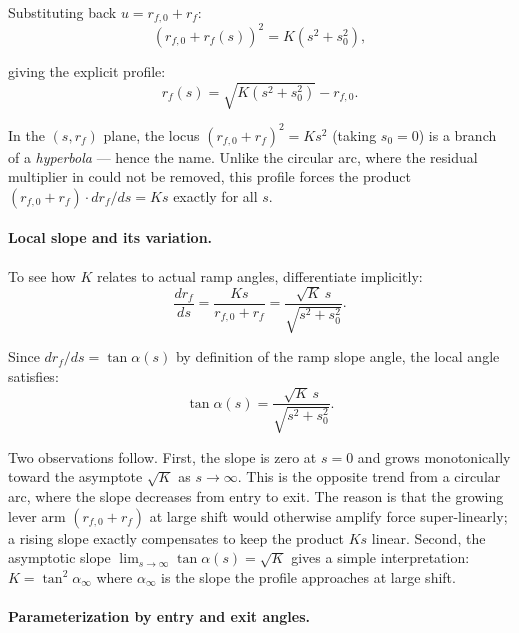 \documentclass[11pt]{article}
\numberwithin{equation}{section}
\begin{document}
Substituting back $u = r_{f,0} + r_f$:
\begin{equation}
\boxed{
(r_{f,0} + r_f(s))^2 = K(s^2 + s_0^2),
}
\label{eq:hyperbolic_ramp}
\end{equation}

giving the explicit profile:
\begin{equation}
r_f(s) = \sqrt{K(s^2 + s_0^2)} - r_{f,0}.
\label{eq:hyperbolic_profile}
\end{equation}

In the $(s, r_f)$ plane, the locus $(r_{f,0}+r_f)^2 = Ks^2$ (taking $s_0 = 0$)
is a branch of a \emph{hyperbola} — hence the name. Unlike the circular arc,
where the residual multiplier in  could not be removed, this
profile forces the product $(r_{f,0}+r_f)\cdot dr_f/ds = Ks$ exactly for all
$s$.

\paragraph{Local slope and its variation.}

To see how $K$ relates to actual ramp angles, differentiate
 implicitly:
\begin{equation}
\frac{dr_f}{ds}
= \frac{K s}{r_{f,0}+r_f}
= \frac{\sqrt{K}\, s}{\sqrt{s^2 + s_0^2}}.
\label{eq:hyperbolic_slope}
\end{equation}

Since $dr_f/ds = \tan\alpha(s)$ by definition of the ramp slope angle, the
local angle satisfies:
\begin{equation}
\tan\alpha(s) = \frac{\sqrt{K}\, s}{\sqrt{s^2 + s_0^2}}.
\label{eq:hyperbolic_angle}
\end{equation}

Two observations follow. First, the slope is zero at $s = 0$ and grows
monotonically toward the asymptote $\sqrt{K}$ as $s \to \infty$. This is the
opposite trend from a circular arc, where the slope decreases from entry to
exit. The reason is that the growing lever arm $(r_{f,0}+r_f)$ at large shift
would otherwise amplify force super-linearly; a rising slope exactly compensates
to keep the product $Ks$ linear. Second, the asymptotic slope
$\lim_{s\to\infty} \tan\alpha(s) = \sqrt{K}$ gives a simple interpretation: $K
= \tan^2\!\alpha_\infty$ where $\alpha_\infty$ is the slope the profile
approaches at large shift.

\paragraph{Parameterization by entry and exit angles.}
\end{document}
